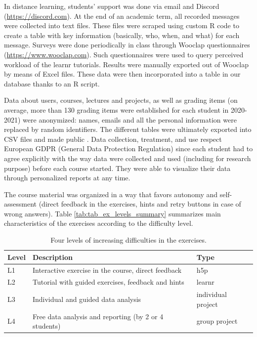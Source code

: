 \documentclass{aims}
\theoremstyle{definition}
\begin{document}
In distance learning, students' support was done via email and Discord
(\url{https://discord.com}). At the end of an academic term, all
recorded messages were collected into text files. These files were
scraped using custom R code to create a table with key information
(basically, who, when, and what) for each message. Surveys were done
periodically in class through Wooclap questionnaires
(\url{https://www.wooclap.com}). Such questionnaires were used to query
perceived workload of the learnr tutorials. Results were manually
exported out of Wooclap by means of Excel files. These data were then
incorporated into a table in our database thanks to an R script.

Data about users, courses, lectures and projects, as well as grading
items (on average, more than 130 grading items were established for each
student in 2020-2021) were anonymized: names, emails and all the
personal information were replaced by random identifiers. The different
tables were ultimately exported into CSV files and made public
\cite{Grosjeandataset2020}. Data collection, treatment, and use respect
European GDPR (General Data Protection Regulation) since each student
had to agree explicitly with the way data were collected and used
(including for research purpose) before each course started. They were
able to visualize their data through personalized reports at any time.

The course material was organized in a way that favors autonomy and
self-assessment (direct feedback in the exercises, hints and retry
buttons in case of wrong answers). Table
\ref {tab:tab_ex_levels_summary} summarizes main characteristics of the
exercises according to the difficulty level.

\begin{table}

\caption{\label{tab:tab_ex_levels_summary}\label{tab:tab_ex_levels} Four levels of increasing difficulties in the exercises.}
\centering
\begin{tabular}[t]{l|l|l}
\hline
Level & Description & Type\\
\hline
L1 & Interactive exercise in the course, direct feedback & h5p\\
\hline
L2 & Tutorial with guided exercises, feedback and hints & learnr\\
\hline
L3 & Individual and guided data analysis & individual project\\
\hline
L4 & Free data analysis and reporting (by 2 or 4 students) & group project\\
\hline
\end{tabular}
\end{table}
\end{document}
